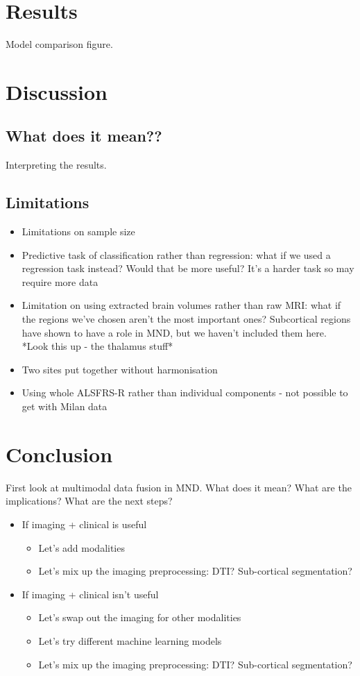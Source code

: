 \section{Results}
Model comparison figure.

\section{Discussion}
\subsection{What does it mean??}
Interpreting the results.

\subsection{Limitations}
\begin{itemize}
    \item Limitations on sample size
    \item Predictive task of classification rather than regression: what if we used a regression task instead? Would that be more useful? It's a harder task so may require more data
    \item Limitation on using extracted brain volumes rather than raw MRI: what if the regions we've chosen aren't the most important ones? Subcortical regions have shown to have a role in MND, but we haven't included them here. *Look this up - the thalamus stuff*
    \item Two sites put together without harmonisation
    \item Using whole ALSFRS-R rather than individual components - not possible to get with Milan data
\end{itemize}

\section{Conclusion}
First look at multimodal data fusion in MND. What does it mean? What are the implications? What are the next steps?
\begin{itemize}
    \item If imaging + clinical is useful
    \begin{itemize}
        \item Let's add modalities
        \item Let's mix up the imaging preprocessing: DTI? Sub-cortical segmentation?
    \end{itemize}
    \item If imaging + clinical isn't useful
    \begin{itemize}
        \item Let's swap out the imaging for other modalities
        \item Let's try different machine learning models
        \item Let's mix up the imaging preprocessing: DTI? Sub-cortical segmentation?
    \end{itemize}
\end{itemize}
